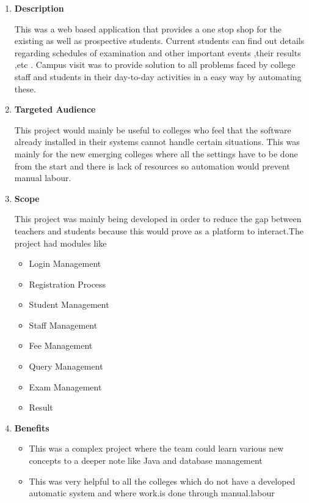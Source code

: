 \documentclass[fleqn,10pt]{../SelfArx} %
\begin{document}
\begin{enumerate}
\item \textbf{Description}

This was a web based application that provides a one stop shop for the existing as well as prospective students. Current students can find out details regarding schedules of examination and other important events ,their results ,etc . Campus visit was to provide solution to all problems faced by college staff and students in their day-to-day activities in a easy way by automating these. 

\item \textbf{Targeted Audience}

This project would mainly be useful to colleges who feel that the software already installed in their systems cannot handle certain situations. This was mainly for the new emerging colleges where all the settings have to be done from the start and there is lack of resources so automation would prevent manual labour.

\item \textbf{Scope}

This project was mainly being developed in order to reduce the gap between teachers and  students because this would prove as a platform to interact.The project had modules like
\begin{itemize}
    \item Login Management 
\item Registration Process 
\item Student Management 
\item Staff Management 
\item Fee Management 
\item Query Management 
\item Exam Management 
\item Result
\end{itemize}


\item \textbf{Benefits }
\begin{itemize}

\item This was a complex project where the team could learn various new concepts to a deeper note like Java and database management

\item This was very helpful to all the colleges which do not have a developed automatic system and where work.is done through manual.labour


\end{itemize}
\end{enumerate}
\end{document}
